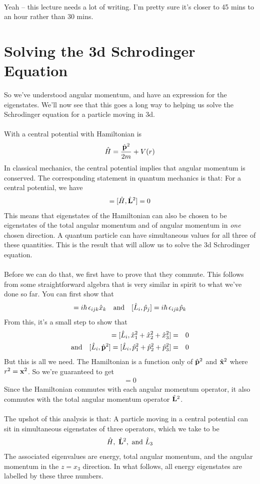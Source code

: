 \documentclass[12pt]{article}
\def\be{\begin{eqnarray}}
\def\ee{\end{eqnarray}}
\newcommand{\nn}{\nonumber}
\newcommand\para{\paragraph{}}
\newcommand{\co}{\color{olive}}
\newcommand{\cred}{\color{red}}
\newcommand{\bx}{{\bf x}}
\begin{document}
{\para
{\cred Yeah -- this lecture needs a lot of writing. I'm pretty sure it's closer to 45 mins to an hour rather than 30 mins.}






\newpage
\section{Solving the 3d Schrodinger Equation}

So we've understood angular momentum, and have an expression for the eigenstates. We'll now see that this goes a long way to helping us solve the Schrodinger equation for a particle moving in 3d.


\para
{\co With a central potential with Hamiltonian is 
%
\be \hat{H} = \frac{\hat{\bf p}^2}{2m}+ V(r)\nn\ee
%
}
In classical mechanics, the central potential implies that angular momentum is conserved. The corresponding statement in quantum mechanics is that: {\co For a central potential, we have
%
\be [\hat{H},\hat{L}_i] = [\hat{H},\hat{\bf L}^2] = 0\nn\ee
%
}
This means that eigenstates of the Hamiltonian can also be chosen to be eigenstates of the total angular momentum and of angular momentum in {\it one} chosen direction. A quantum particle can have simultaneous values for all three of these quantities. This is the result that will allow us to solve the 3d Schrodinger equation.

\para
Before we can do that, we first have to prove that they commute. {\co This follows from some straightforward algebra that is very similar in spirit to what we've done so far. You can first show that
%
\be [\hat{L}_i,\hat{x}_j] = i\hbar\,\epsilon_{ijk} \hat{x}_k\ \ \ {\rm and}\ \ \  [\hat{L}_i,\hat{p}_j] = i\hbar\,\epsilon_{ijk} \hat{p}_k\nn\ee
%
From this, it's a small step to show that 
%
\be [\hat{L}_i,\hat{\bf x}^2] =  [\hat{L}_i,\hat{x}_1^2+\hat{x}_2^2+\hat{x}_3^2] &=& 0\nn\\ {\rm and}\ \ \ 
 [\hat{L}_i,\hat{\bf p}^2] =  [\hat{L}_i,\hat{p}_1^2+\hat{p}_2^2+\hat{p}_3^2] &=& 0 \nn\ee
But this is all we need. The Hamiltonian  is a function only of $\hat{\bf p}^2$ and $\hat{\bf x}^2$ where $r^2 = \bx^2$.  So we're guaranteed to get 
%
\be [\hat{H},\hat{L}_i]=0 \nn\ee
%
Since the Hamiltonian commutes with each angular momentum operator, it also commutes with the total angular momentum operator $\hat{\bf L}^2$.}

\para
The upshot of this analysis is that: {\co A particle moving in a central potential can sit in  simultaneous eigenstates of three operators, which we  take to be
%
\be \hat{H},\ \hat{\bf L}^2,\ {\rm and}\ \hat{L}_3\nn\ee
%
The associated eigenvalues are energy, total angular momentum, and the angular momentum in the $z=x_3$ direction. In what follows, all energy eigenstates are labelled by these three numbers. }

}
\end{document}
